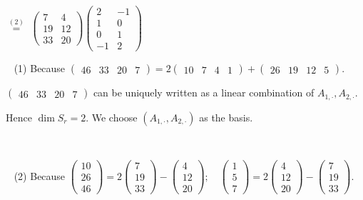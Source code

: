 \documentclass[a4paper, 11pt, UTF8]{article}
\begin{document}
\begin{large}
{{$\overset{(2)}{=}$}
$\begin{pmatrix} 7 & 4\\ 19 & 12\\ 33 & 20\end{pmatrix}\begin{pmatrix} 2 & -1\\ 1 & 0\\ 0 & 1\\ -1 & 2\end{pmatrix}$}\par\,\,\,
(1) Because {\small$\begin{pmatrix} 46 & 33 & 20 & 7 \end{pmatrix}=2\begin{pmatrix} 10 & 7 & 4 & 1\end{pmatrix}+\begin{pmatrix} 26 & 19 & 12 & 5\end{pmatrix}$}.\par\qquad
{\small$\begin{pmatrix} 46 & 33 & 20 & 7 \end{pmatrix}$} can be uniquely written as a linear combination of $A_{1,\cdot},A_{2,\cdot}$.\par\qquad
Hence $\dim S_r=2$. We choose $(A_{1,\cdot},A_{2,\cdot})$ as the basis.\par{\tiny\,\par}\,\,\,
(2) Because {\small$\begin{pmatrix} 10\\ 26\\ 46\end{pmatrix}=2\begin{pmatrix} 7\\ 19\\ 33\end{pmatrix}-\begin{pmatrix} 4\\ 12\\ 20\end{pmatrix}; \quad \begin{pmatrix} 1\\ 5\\ 7\end{pmatrix}=2\begin{pmatrix} 4\\ 12\\ 20\end{pmatrix}-\begin{pmatrix} 7\\ 19\\ 33\end{pmatrix}$}.\par{\tiny\,\par}\qquad

\end{large}
\end{document}
